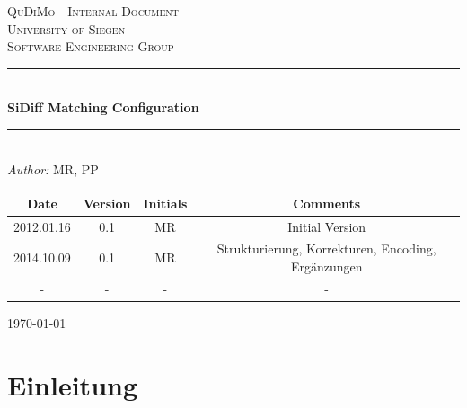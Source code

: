 \documentclass{article}
\begin{document}
\newcommand{\HRule}{\rule{\linewidth}{0.5mm}}



\begin{titlepage}

\begin{center}




\textsc{\LARGE QuDiMo - Internal Document}\\[1.5cm]

\textsc{\large University of Siegen}\\
\textsc{\large Software Engineering Group}\\[0.5cm]


\HRule \\[0.4cm]
{ \huge \bfseries SiDiff Matching Configuration} \\[0.4cm]

\HRule \\[1.5cm]

\emph{Author:} MR, PP\\


\vfill
\begin{center}
  \begin{tabular}{| c || c | c | c | }
    \hline
    Date & Version & Initials & Comments\\ \hline
    2012.01.16 & 0.1 & MR & Initial Version \\ \hline
    2014.10.09 & 0.1 & MR & Strukturierung, Korrekturen, Encoding, Ergänzungen
    \\
    \hline - & - & - & -\\
    \hline
  \end{tabular}
\end{center}
{\large \today}

\end{center}

\end{titlepage}

\section{Einleitung}
\end{document}
